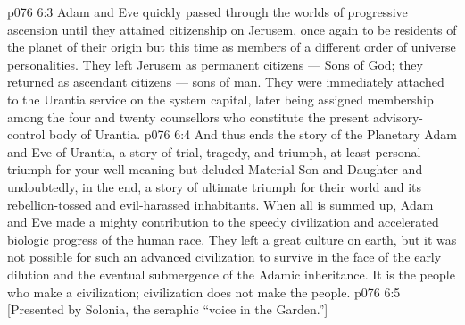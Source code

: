 \vs p076 6:3 \pc Adam and Eve quickly passed through the worlds of progressive ascension until they attained citizenship on Jerusem, once again to be residents of the planet of their origin but this time as members of a different order of universe personalities. They left Jerusem as permanent citizens --- Sons of God; they returned as ascendant citizens --- sons of man. They were immediately attached to the Urantia service on the system capital, later being assigned membership among the four and twenty counsellors who constitute the present advisory\hyp{}control body of Urantia.
\vs p076 6:4 \pc And thus ends the story of the Planetary Adam and Eve of Urantia, a story of trial, tragedy, and triumph, at least personal triumph for your well\hyp{}meaning but deluded Material Son and Daughter and undoubtedly, in the end, a story of ultimate triumph for their world and its rebellion\hyp{}tossed and evil\hyp{}harassed inhabitants. When all is summed up, Adam and Eve made a mighty contribution to the speedy civilization and accelerated biologic progress of the human race. They left a great culture on earth, but it was not possible for such an advanced civilization to survive in the face of the early dilution and the eventual submergence of the Adamic inheritance. It is the people who make a civilization; civilization does not make the people.
\vsetoff
\vs p076 6:5 [Presented by Solonia, the seraphic “voice in the Garden.”]

